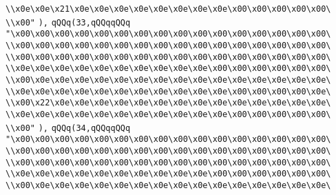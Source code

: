 \verb|\\x0e\x0e\x21\x0e\x0e\x0e\x0e\x0e\x0e\x0e\x0e\x00\x00\x00\x00\x00\|\newline
\verb|\\x00"|\newline
\verb|),|\newline
\verb|qQQq(33,qQQqqQQq|\newline
\verb|"\x00\x00\x00\x00\x00\x00\x00\x00\x00\x00\x00\x00\x00\x00\x00\x00\|\newline
\verb|\\x00\x00\x00\x00\x00\x00\x00\x00\x00\x00\x00\x00\x00\x00\x00\x00\|\newline
\verb|\\x00\x00\x00\x00\x00\x00\x00\x00\x00\x00\x00\x00\x00\x00\x00\x00\|\newline
\verb|\\x0e\x0e\x0e\x0e\x0e\x0e\x0e\x0e\x0e\x0e\x00\x00\x00\x00\x00\x00\|\newline
\verb|\\x00\x0e\x0e\x0e\x0e\x0e\x0e\x0e\x0e\x0e\x0e\x0e\x0e\x0e\x0e\x0e\|\newline
\verb|\\x0e\x0e\x0e\x0e\x0e\x0e\x0e\x0e\x0e\x0e\x0e\x00\x00\x00\x00\x0e\|\newline
\verb|\\x00\x22\x0e\x0e\x0e\x0e\x0e\x0e\x0e\x0e\x0e\x0e\x0e\x0e\x0e\x0e\|\newline
\verb|\\x0e\x0e\x0e\x0e\x0e\x0e\x0e\x0e\x0e\x0e\x0e\x00\x00\x00\x00\x00\|\newline
\verb|\\x00"|\newline
\verb|),|\newline
\verb|qQQq(34,qQQqqQQq|\newline
\verb|"\x00\x00\x00\x00\x00\x00\x00\x00\x00\x00\x00\x00\x00\x00\x00\x00\|\newline
\verb|\\x00\x00\x00\x00\x00\x00\x00\x00\x00\x00\x00\x00\x00\x00\x00\x00\|\newline
\verb|\\x00\x00\x00\x00\x00\x00\x00\x00\x00\x00\x00\x00\x00\x00\x00\x00\|\newline
\verb|\\x0e\x0e\x0e\x0e\x0e\x0e\x0e\x0e\x0e\x0e\x00\x00\x00\x00\x00\x00\|\newline
\verb|\\x00\x0e\x0e\x0e\x0e\x0e\x0e\x0e\x0e\x0e\x0e\x0e\x0e\x0e\x0e\x0e\|\newline

